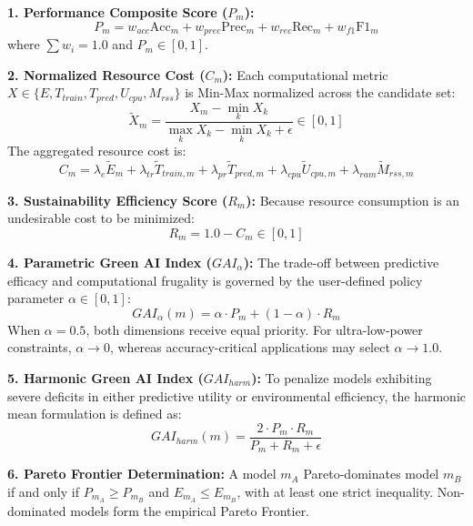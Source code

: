 \documentclass[conference]{IEEEtran}
\begin{document}
\textbf{1. Performance Composite Score ($P_m$):}
\begin{equation}
    P_m = w_{acc} \text{Acc}_m + w_{prec} \text{Prec}_m + w_{rec} \text{Rec}_m + w_{f1} \text{F1}_m
\end{equation}
where $\sum w_i = 1.0$ and $P_m \in [0, 1]$.

\textbf{2. Normalized Resource Cost ($C_m$):}
Each computational metric $X \in \{E, T_{train}, T_{pred}, U_{cpu}, M_{rss}\}$ is Min-Max normalized across the candidate set:
\begin{equation}
    \widetilde{X}_m = \frac{X_m - \min_{k} X_k}{\max_{k} X_k - \min_{k} X_k + \epsilon} \in [0, 1]
\end{equation}
The aggregated resource cost is:
\begin{equation}
    C_m = \lambda_e \widetilde{E}_m + \lambda_{tr} \widetilde{T}_{train,m} + \lambda_{pr} \widetilde{T}_{pred,m} + \lambda_{cpu} \widetilde{U}_{cpu,m} + \lambda_{ram} \widetilde{M}_{rss,m}
\end{equation}

\textbf{3. Sustainability Efficiency Score ($R_m$):}
Because resource consumption is an undesirable cost to be minimized:
\begin{equation}
    R_m = 1.0 - C_m \in [0, 1]
\end{equation}

\textbf{4. Parametric Green AI Index ($GAI_{\alpha}$):}
The trade-off between predictive efficacy and computational frugality is governed by the user-defined policy parameter $\alpha \in [0, 1]$:
\begin{equation}
    GAI_{\alpha}(m) = \alpha \cdot P_m + (1 - \alpha) \cdot R_m
\end{equation}
When $\alpha = 0.5$, both dimensions receive equal priority. For ultra-low-power constraints, $\alpha \to 0$, whereas accuracy-critical applications may select $\alpha \to 1.0$.

\textbf{5. Harmonic Green AI Index ($GAI_{harm}$):}
To penalize models exhibiting severe deficits in either predictive utility or environmental efficiency, the harmonic mean formulation is defined as:
\begin{equation}
    GAI_{harm}(m) = \frac{2 \cdot P_m \cdot R_m}{P_m + R_m + \epsilon}
\end{equation}

\textbf{6. Pareto Frontier Determination:}
A model $m_A$ Pareto-dominates model $m_B$ if and only if $P_{m_A} \ge P_{m_B}$ and $E_{m_A} \le E_{m_B}$, with at least one strict inequality. Non-dominated models form the empirical Pareto Frontier.
\end{document}
